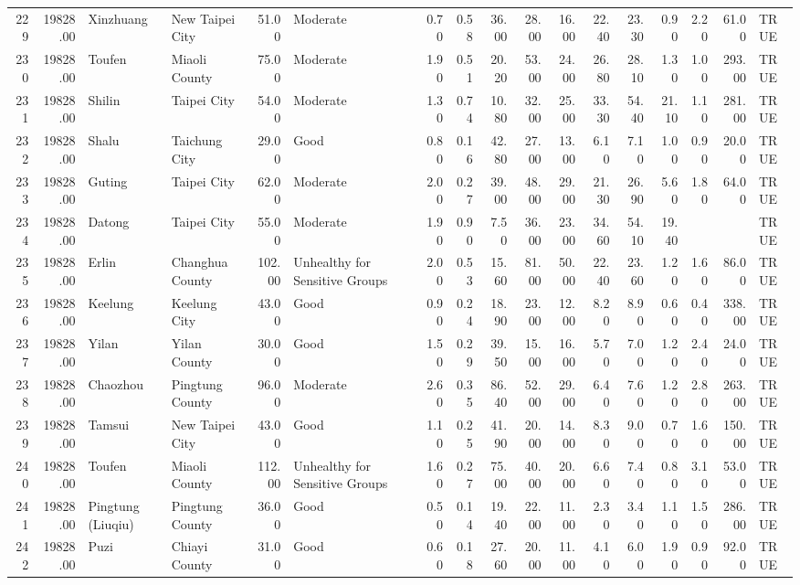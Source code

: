 \begin{table}[ht]
\begin{tabular}{rrllrlrrrrrrrrrrl}
  229 & 19828.00 & Xinzhuang & New Taipei City & 51.00 & Moderate & 0.70 & 0.58 & 36.00 & 28.00 & 16.00 & 22.40 & 23.30 & 0.90 & 2.20 & 61.00 & TRUE \\ 
  230 & 19828.00 & Toufen & Miaoli County & 75.00 & Moderate & 1.90 & 0.51 & 20.20 & 53.00 & 24.00 & 26.80 & 28.10 & 1.30 & 1.00 & 293.00 & TRUE \\ 
  231 & 19828.00 & Shilin & Taipei City & 54.00 & Moderate & 1.30 & 0.74 & 10.80 & 32.00 & 25.00 & 33.30 & 54.40 & 21.10 & 1.10 & 281.00 & TRUE \\ 
  232 & 19828.00 & Shalu & Taichung City & 29.00 & Good & 0.80 & 0.16 & 42.80 & 27.00 & 13.00 & 6.10 & 7.10 & 1.00 & 0.90 & 20.00 & TRUE \\ 
  233 & 19828.00 & Guting & Taipei City & 62.00 & Moderate & 2.00 & 0.27 & 39.00 & 48.00 & 29.00 & 21.30 & 26.90 & 5.60 & 1.80 & 64.00 & TRUE \\ 
  234 & 19828.00 & Datong & Taipei City & 55.00 & Moderate & 1.90 & 0.90 & 7.50 & 36.00 & 23.00 & 34.60 & 54.10 & 19.40 &  &  & TRUE \\ 
  235 & 19828.00 & Erlin & Changhua County & 102.00 & Unhealthy for Sensitive Groups & 2.00 & 0.53 & 15.60 & 81.00 & 50.00 & 22.40 & 23.60 & 1.20 & 1.60 & 86.00 & TRUE \\ 
  236 & 19828.00 & Keelung & Keelung City & 43.00 & Good & 0.90 & 0.24 & 18.90 & 23.00 & 12.00 & 8.20 & 8.90 & 0.60 & 0.40 & 338.00 & TRUE \\ 
  237 & 19828.00 & Yilan & Yilan County & 30.00 & Good & 1.50 & 0.29 & 39.50 & 15.00 & 16.00 & 5.70 & 7.00 & 1.20 & 2.40 & 24.00 & TRUE \\ 
  238 & 19828.00 & Chaozhou & Pingtung County & 96.00 & Moderate & 2.60 & 0.35 & 86.40 & 52.00 & 29.00 & 6.40 & 7.60 & 1.20 & 2.80 & 263.00 & TRUE \\ 
  239 & 19828.00 & Tamsui & New Taipei City & 43.00 & Good & 1.10 & 0.25 & 41.90 & 20.00 & 14.00 & 8.30 & 9.00 & 0.70 & 1.60 & 150.00 & TRUE \\ 
  240 & 19828.00 & Toufen & Miaoli County & 112.00 & Unhealthy for Sensitive Groups & 1.60 & 0.27 & 75.00 & 40.00 & 20.00 & 6.60 & 7.40 & 0.80 & 3.10 & 53.00 & TRUE \\ 
  241 & 19828.00 & Pingtung (Liuqiu) & Pingtung County & 36.00 & Good & 0.50 & 0.14 & 19.40 & 22.00 & 11.00 & 2.30 & 3.40 & 1.10 & 1.50 & 286.00 & TRUE \\ 
  242 & 19828.00 & Puzi & Chiayi County & 31.00 & Good & 0.60 & 0.18 & 27.60 & 20.00 & 11.00 & 4.10 & 6.00 & 1.90 & 0.90 & 92.00 & TRUE \\ 

\end{tabular}
\end{table}
